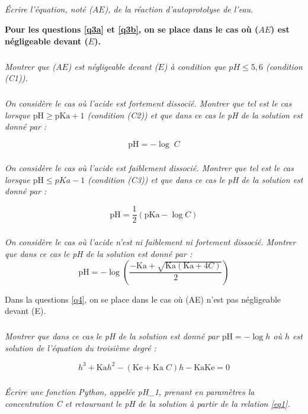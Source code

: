 \documentclass[10pt,oneside]{article}
\begin{document}
\subparagraph{\label{q2}}
\textit{Écrire l’équation, noté ($AE$), de la réaction d’autoprotolyse de l’eau.}

\vspace{.5cm}

\textbf{Pour les questions \ref{q3a} et \ref{q3b}, on se place dans le cas où ($AE$) est négligeable devant ($E$).}

\subparagraph{\label{q3a}}
\textit{Montrer que ($AE$) est négligeable devant ($E$) à condition que $pH \leq 5,6$ (condition (C1)).}

\subparagraph{\label{q3b}}
\textit{On considère le cas où l’acide est fortement dissocié. Montrer que tel est le cas lorsque 
$\text{pH} \geq \text{pKa} +1$ (condition (C2)) et que dans ce cas le pH de la solution est donné par : }

\begin{equation} \label{eq1}
\text{pH}= -\log\; C 
\end{equation}


\subparagraph{\label{q3c}}
\textit{On considère le cas où l’acide est faiblement dissocié. Montrer que tel est le cas lorsque 
$\text{pH} \leq pKa -1$ (condition (C3)) et que dans ce cas le pH de la solution est donné par : }

\begin{equation} \label{eq2}
\text{pH} = \dfrac{1}{2} \left(\text{pKa}- \log C \right)
\end{equation}

\subparagraph{\label{q3d}}
\textit{On considère le cas où l’acide n’est ni faiblement ni fortement dissocié. Montrer que dans ce cas 
le pH de la solution est donné par :}
\begin{equation} \label{eq3}
\text{pH} = - \log \left( \dfrac{-\text{Ka} + \sqrt{\text{Ka}\left( \text{Ka} + 4C\right)}}{2}\right)
\end{equation}


Dans la questions \ref{q4},
 on se place dans le cas où (AE) n’est pas négligeable devant (E). 
\subparagraph{\label{q4}}
\textit{Montrer que dans ce cas le pH de la solution est donné par $\text{pH} = - \log h$ où $h$ est solution de l’équation 
du troisième degré :}

\begin{equation} \label{eq4}
h^3 + \text{Ka}h^2 - \left(\text{Ke} + \text{Ka}\; C\right)h - \text{Ka} \text{Ke} = 0
\end{equation}


\subparagraph{\label{q5a}}
\textit{ Écrire une fonction Python, appelée pH\_1, prenant en paramètres la concentration C et retournant 
le pH de la solution à partir de la relation \eqref{eq1}. }
\end{document}
